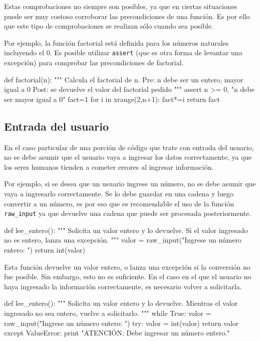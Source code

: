 Estas comprobaciones no siempre son posibles, ya que en ciertas situaciones
puede ser muy costoso corroborar las precondiciones de una función. Es por
ello que este tipo de comprobaciones se realizan sólo cuando sea posible.

Por ejemplo, la función factorial está definida para los números naturales
incluyendo el 0. Es posible utilizar \lstinline!assert! (que es otra forma de
levantar una excepción) para comprobar las precondiciones de factorial.

\begin{codigo-python}
def factorial(n):
	""" Calcula el factorial de n.
	Pre: n debe ser un entero, mayor igual a 0
	Post: se devuelve el valor del factorial pedido
	"""
	assert n >= 0, "n debe ser mayor igual a 0"
	fact=1
	for i in xrange(2,n+1):
		fact*=i
	return fact
\end{codigo-python}

\subsection{Entrada del usuario}

En el caso particular de una porción de código que trate con entrada del
usuario, no se debe asumir que el usuario vaya a ingresar los datos
correctamente, ya que los seres humanos tienden a cometer errores al ingresar
información.

Por ejemplo, si se desea que un usuario ingrese un número, no se debe asumir
que vaya a ingresarlo correctamente. Se lo debe guardar en una cadena y luego
convertir a un número, es por eso que es recomendable el uso de la
función \lstinline!raw_input! ya que devuelve una cadena que puede ser
procesada posteriormente.

\begin{codigo-python-sn}
def lee_entero():
    """ Solicita un valor entero y lo devuelve.
        Si el valor ingresado no es entero, lanza una excepción. """
    valor = raw_input("Ingrese un número entero: ")
    return int(valor)
\end{codigo-python-sn}

Esta función devuelve un valor entero, o lanza una excepción si la conversión
no fue posible.  Sin embargo, esto no es suficiente.  En el caso en el que el
usuario no haya ingresado la información correctamente, es necesario volver a
solicitarla.

\begin{codigo-python-sn}
def lee_entero():
    """ Solicita un valor entero y lo devuelve.
        Mientras el valor ingresado no sea entero, vuelve a solicitarlo. """
    while True:
        valor = raw_input("Ingrese un número entero: ")
		try:
			valor = int(valor)
            return valor
        except ValueError:
            print "ATENCIÓN: Debe ingresar un número entero."
\end{codigo-python-sn}


